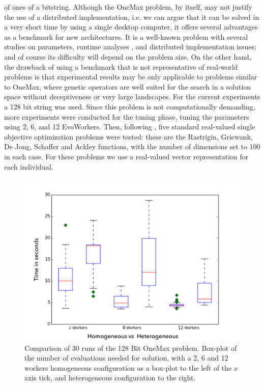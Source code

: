 \documentclass[conference]{IEEEtran}
\begin{document}
of ones of a bitstring. Although the OneMax problem, by itself, may not justify the use of a distributed
implementation, i.e. we can argue that it can be solved in a very short time by using a
single desktop computer, it offers several advantages as a
benchmark for new architectures. It is a well-known problem with several
studies on parameters,  runtime analyses \cite{DBLP:journals/corr/MereloGVB15},
and distributed implementation
issues; and of course its difficulty will depend on the problem size. On the other hand, the drawback of using a benchmark that is not representative of
real-world problems is that experimental results may be only applicable to
problems similar to OneMax, where genetic operators are well suited for the
search in a solution space without deceptiveness or very large landscapes.
For the current experiments a 128 bit string was used. Since this
problem is not computationally demanding, more experiments were conducted for the tuning phase,
tuning the parameters using 2, 6, and 12 EvoWorkers. Then, following \cite{fuku1},
five standard real-valued single objective optimization problems were
tested: these are the Rastrigin, Griewank, De Jong, Schaffer  and
Ackley functions,
with the number of dimensions set to 100 in each case. For these problems we use a real-valued vector
representation for each individual.

  \begin{figure}[h!tb]
    \centering
        \includegraphics[width=12cm]{img/one_max_comp.png}
    \caption{Comparison of 30 runs of the 128 Bit OneMax problem.
    Box-plot of the number of evaluations needed for solution, with a 2, 6 and 12 workers
    homogeneous configuration as a box-plot to the left of the $x$ axis
    tick, and heterogeneous configuration to the right.
    }
    \label{fig:comp-onemax}
  \end{figure}
%
\end{document}
